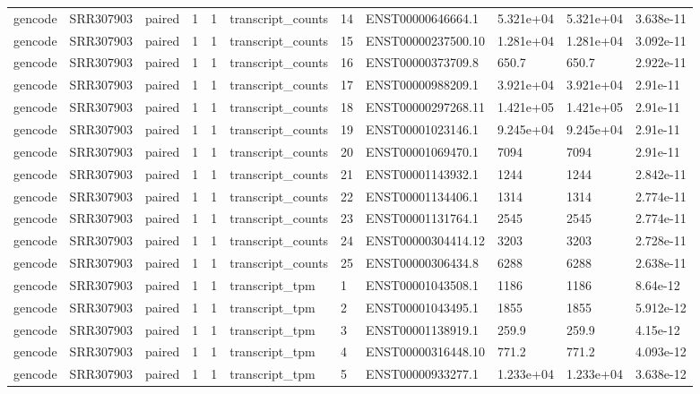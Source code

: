\begin{tabular}{lllllllllll}
gencode & SRR307903 & paired & 1 & 1 & transcript\_counts & 14 & ENST00000646664.1 & 5.321e+04 & 5.321e+04 & 3.638e-11 \\
gencode & SRR307903 & paired & 1 & 1 & transcript\_counts & 15 & ENST00000237500.10 & 1.281e+04 & 1.281e+04 & 3.092e-11 \\
gencode & SRR307903 & paired & 1 & 1 & transcript\_counts & 16 & ENST00000373709.8 & 650.7 & 650.7 & 2.922e-11 \\
gencode & SRR307903 & paired & 1 & 1 & transcript\_counts & 17 & ENST00000988209.1 & 3.921e+04 & 3.921e+04 & 2.91e-11 \\
gencode & SRR307903 & paired & 1 & 1 & transcript\_counts & 18 & ENST00000297268.11 & 1.421e+05 & 1.421e+05 & 2.91e-11 \\
gencode & SRR307903 & paired & 1 & 1 & transcript\_counts & 19 & ENST00001023146.1 & 9.245e+04 & 9.245e+04 & 2.91e-11 \\
gencode & SRR307903 & paired & 1 & 1 & transcript\_counts & 20 & ENST00001069470.1 & 7094 & 7094 & 2.91e-11 \\
gencode & SRR307903 & paired & 1 & 1 & transcript\_counts & 21 & ENST00001143932.1 & 1244 & 1244 & 2.842e-11 \\
gencode & SRR307903 & paired & 1 & 1 & transcript\_counts & 22 & ENST00001134406.1 & 1314 & 1314 & 2.774e-11 \\
gencode & SRR307903 & paired & 1 & 1 & transcript\_counts & 23 & ENST00001131764.1 & 2545 & 2545 & 2.774e-11 \\
gencode & SRR307903 & paired & 1 & 1 & transcript\_counts & 24 & ENST00000304414.12 & 3203 & 3203 & 2.728e-11 \\
gencode & SRR307903 & paired & 1 & 1 & transcript\_counts & 25 & ENST00000306434.8 & 6288 & 6288 & 2.638e-11 \\
gencode & SRR307903 & paired & 1 & 1 & transcript\_tpm & 1 & ENST00001043508.1 & 1186 & 1186 & 8.64e-12 \\
gencode & SRR307903 & paired & 1 & 1 & transcript\_tpm & 2 & ENST00001043495.1 & 1855 & 1855 & 5.912e-12 \\
gencode & SRR307903 & paired & 1 & 1 & transcript\_tpm & 3 & ENST00001138919.1 & 259.9 & 259.9 & 4.15e-12 \\
gencode & SRR307903 & paired & 1 & 1 & transcript\_tpm & 4 & ENST00000316448.10 & 771.2 & 771.2 & 4.093e-12 \\
gencode & SRR307903 & paired & 1 & 1 & transcript\_tpm & 5 & ENST00000933277.1 & 1.233e+04 & 1.233e+04 & 3.638e-12 \\

\end{tabular}
